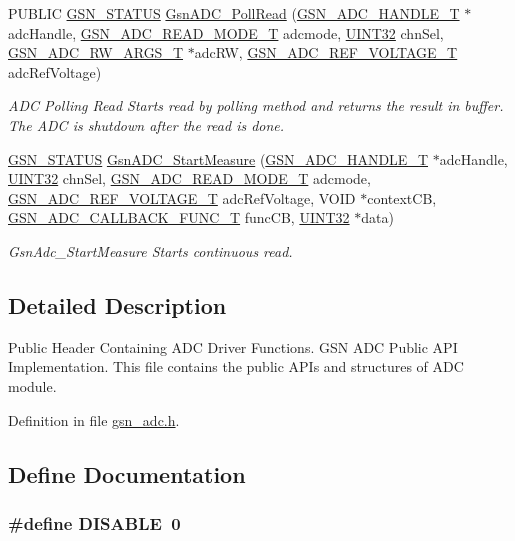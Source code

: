 \begin{DoxyCompactItemize}
PUBLIC \hyperlink{a00660_gada5951904ac6110b1fa95e51a9ddc217}{GSN\_\-STATUS} \hyperlink{a00643_gaab53aee6b55a63e421310ec8a818dcb1}{GsnADC\_\-PollRead} (\hyperlink{a00024}{GSN\_\-ADC\_\-HANDLE\_\-T} $\ast$adcHandle, \hyperlink{a00643_ga67df3ab0d6b619d585d941ad1f3f0233}{GSN\_\-ADC\_\-READ\_\-MODE\_\-T} adcmode, \hyperlink{a00660_gae1e6edbbc26d6fbc71a90190d0266018}{UINT32} chnSel, \hyperlink{a00025}{GSN\_\-ADC\_\-RW\_\-ARGS\_\-T} $\ast$adcRW, \hyperlink{a00643_ga560e320e7f3b88d78bb8d8766a8c7445}{GSN\_\-ADC\_\-REF\_\-VOLTAGE\_\-T} adcRefVoltage)
\begin{DoxyCompactList}\small\item\em ADC Polling Read Starts read by polling method and returns the result in buffer. The ADC is shutdown after the read is done. \end{DoxyCompactList}\item 
\hyperlink{a00660_gada5951904ac6110b1fa95e51a9ddc217}{GSN\_\-STATUS} \hyperlink{a00643_gab93bdcc54f8ab4870ef3b5a12ac1c920}{GsnADC\_\-StartMeasure} (\hyperlink{a00024}{GSN\_\-ADC\_\-HANDLE\_\-T} $\ast$adcHandle, \hyperlink{a00660_gae1e6edbbc26d6fbc71a90190d0266018}{UINT32} chnSel, \hyperlink{a00643_ga67df3ab0d6b619d585d941ad1f3f0233}{GSN\_\-ADC\_\-READ\_\-MODE\_\-T} adcmode, \hyperlink{a00643_ga560e320e7f3b88d78bb8d8766a8c7445}{GSN\_\-ADC\_\-REF\_\-VOLTAGE\_\-T} adcRefVoltage, VOID $\ast$contextCB, \hyperlink{a00643_ga988a548c116a5b35c3725a268f74519a}{GSN\_\-ADC\_\-CALLBACK\_\-FUNC\_\-T} funcCB, \hyperlink{a00660_gae1e6edbbc26d6fbc71a90190d0266018}{UINT32} $\ast$data)
\begin{DoxyCompactList}\small\item\em GsnAdc\_\-StartMeasure Starts continuous read. \end{DoxyCompactList}\end{DoxyCompactItemize}


\subsection{Detailed Description}
Public Header Containing ADC Driver Functions. GSN ADC Public API Implementation. This file contains the public APIs and structures of ADC module.

Definition in file \hyperlink{a00474_source}{gsn\_\-adc.h}.



\subsection{Define Documentation}
\hypertarget{a00474_a99496f7308834e8b220f7894efa0b6ab}{
\subsubsection[{DISABLE}]{\setlength{\rightskip}{0pt plus 5cm}\#define DISABLE~0}}
\label{a00474_a99496f7308834e8b220f7894efa0b6ab}


